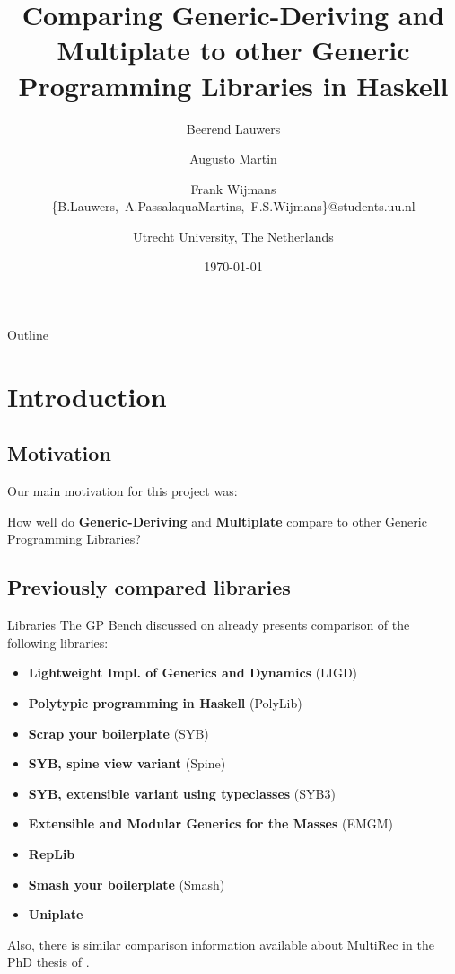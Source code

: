 \documentclass[10pt]{beamer}
\author{
	Beerend Lauwers\\
	\and 
	Augusto Martin\\	
	\and
	Frank Wijmans\newline\\
	\hbox{\{B.Lauwers, A.PassalaquaMartins, F.S.Wijmans\}@students.uu.nl}
	\and
	\newline Utrecht University, The Netherlands}
\date{\today}
\title{Comparing \textbf{Generic-Deriving} and \textbf{Multiplate} to other Generic Programming Libraries in Haskell}
\begin{document}
\frame{\titlepage}

\begin{frame}{Outline}
\tableofcontents
\end{frame}

\section{Introduction}
\subsection*{Motivation}
\begin{frame}
Our main motivation for this project was:

How well do \textbf{Generic-Deriving} and \textbf{Multiplate} compare to other Generic Programming Libraries?
\end{frame}

\subsection*{Previously compared libraries}

\begin{frame}{Libraries}
The GP Bench discussed on \citet{Rodriguez:2008:art} already presents comparison of the following libraries:
\begin{small}
\begin{itemize}
\item \textbf{Lightweight Impl. of Generics and Dynamics} (LIGD)
\item \textbf{Polytypic programming in Haskell} (PolyLib)
\item \textbf{Scrap your boilerplate} (SYB)
\item \textbf{SYB, spine view variant} (Spine)
\item \textbf{SYB, extensible variant using typeclasses} (SYB3)
\item \textbf{Extensible and Modular Generics for the Masses} (EMGM)
\item \textbf{RepLib}
\item \textbf{Smash your boilerplate} (Smash)
\item \textbf{Uniplate}
\end{itemize}
\end{small}
Also, there is similar comparison information available about MultiRec in the PhD thesis of \citet{Rodriguez:2009:phd}.
\end{frame}
\end{document}
